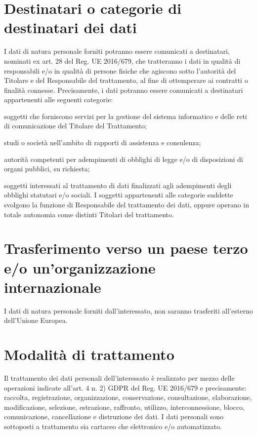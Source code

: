 \documentclass[legalpaper, 11pt]{exam}
\let\tempone\enumerate
\let\temptwo\endenumerate
\renewenvironment{enumerate}{\tempone\addtolength{\itemsep}{-0.45\baselineskip}}{\temptwo}
\begin{document}
{\section{Destinatari o categorie di destinatari dei dati}
I dati di natura personale forniti potranno essere comunicati a destinatari, nominati ex art. 28 del Reg. UE 2016/679, che tratteranno i dati in qualità di responsabili e/o in qualità di persone fisiche che agiscono sotto l’autorità del Titolare e del Responsabile del trattamento, al fine di ottemperare ai contratti o finalità connesse. Precisamente, i dati potranno essere comunicati a destinatari appartenenti alle seguenti categorie:
\begin{enumerate}
	\item  soggetti che forniscono servizi per la gestione del sistema informatico e delle reti di comunicazione del Titolare del Trattamento;
	\item studi o società nell’ambito di rapporti di assistenza e consulenza; 
	\item autorità competenti per adempimenti di obblighi di legge e/o di disposizioni di organi pubblici, su richiesta;
	\item soggetti interessati al trattamento di dati finalizzati agli adempimenti degli obblighi statutari e/o sociali.
\end{enumerate}
I soggetti appartenenti alle categorie suddette svolgono la funzione di Responsabile del trattamento dei dati, oppure operano in totale autonomia come distinti Titolari del trattamento.

\section{Trasferimento verso un paese terzo e/o un'organizzazione internazionale}

I dati di natura personale forniti dall’interessato, non saranno trasferiti all’esterno dell’Unione Europea.


\section{Modalità di trattamento}
Il trattamento dei dati personali dell’interessato è realizzato per mezzo delle operazioni indicate all’art. 4 n. 2) GDPR del Reg. UE 2016/679 e precisamente: raccolta, registrazione, organizzazione, conservazione, consultazione, elaborazione, modificazione, selezione, estrazione, raffronto, utilizzo, interconnessione, blocco, comunicazione, cancellazione e distruzione dei dati. I dati personali sono sottoposti a trattamento sia cartaceo che elettronico e/o automatizzato.

}
\end{document}
